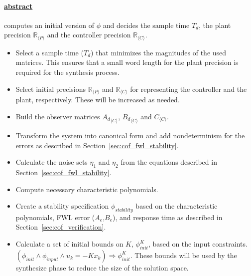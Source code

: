 \documentclass[sigconf]{llncs}
\newcommand{\mat}[1]{{#1}}
\renewcommand{\vec}[1]{{#1}}
\renewcommand{\note}[1]{\textcolor{red}{[#1]}}
\begin{document}
\paragraph{\underline{{\sc abstract}}} computes an initial version of $\phi$
and decides the sample time $T_d$,
the plant precision $\mathbb{R}_{\langle P \rangle}$ and the controller precision
$\mathbb{R}_{\langle C \rangle}$.
%
\begin{itemize}
\item Select a sample time ($T_d$) that minimizes the magnitudes of the used matrices.
This ensures that a small word length for the plant precision is required for
the synthesis process.
\item Select initial precisions $\mathbb{R}_{\langle P \rangle}$ and $\mathbb{R}_{\langle C \rangle}$
  for representing the controller and the plant, respectively. These will be increased as needed.
\item Build the observer matrices ${\mat{A}_d}_{\langle C \rangle}$, ${\mat{B}_d}_{\langle C \rangle}$
and $\mat{C}_{\langle C \rangle}$. %
\item Transform the system into canonical form and add nondeterminism for the errors
as described in Section~\ref{sec:cof_fwl_stability}. 
\item Calculate the noise sets $\eta_1$ and $\eta_2$ from the equations
described in Section~\ref{sec:cof_fwl_stability}.
\item Compute necessary characteristic polynomials. 
\item Create a stability specification $\phi_{stability}$ based on the characteristic polynomials, FWL
error ($\mat{A}_e$,$\mat{B}_e$), and response time %
as described in Section~\ref{sec:cof_verification}.%
\item Calculate a set of initial bounds on $\mat{K}$, 
$\phi_\mathit{init}^{K}$,
based on the input constraints.
$(\phi_\mathit{init} \wedge \phi_\mathit{input} \wedge u_k=-\mat{K} \vec{x}_k)
\Rightarrow \phi_\mathit{init}^{K}$.
These bounds will be used by the {\sc synthesize} phase to reduce the size of the solution space.
\end{itemize}
\end{document}
